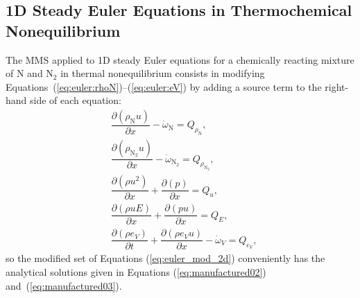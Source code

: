 \documentclass[10pt]{article}
\newcommand{\Diff}[2] {\dfrac{\partial( #1)}{\partial #2}}
\begin{document}

\subsection{1D Steady Euler Equations in Thermochemical Nonequilibrium}

The MMS applied to 1D steady Euler equations for a chemically reacting mixture of  N and N$_{2}$ in thermal nonequilibrium consists in modifying  Equations~(\ref{eq:euler:rhoN})--(\ref{eq:euler:eV}) by adding a source term to the right-hand side of each equation:
\begin{equation}
 \label{eq:euler_mod_2d}
\begin{split}
&\Diff{\rho_{\text{N}} u}{x} -\dot{\omega}_{\text{N}}= Q_{\rho_{\text{N}}},\\
&\Diff{\rho_{\text{N}_2} u}{x} -\dot{\omega}_{\text{N}_2}= Q_{\rho_{\text{N}_2}},\\
&\Diff{\rho u^2 }{x}+ \Diff{p}{x} = Q_u,\\
&\Diff{\rho uE}{x}+ \Diff{pu}{x} = Q_{E},\\
&\Diff{\rho e_V }{t} + \Diff{\rho e_V u }{x}-\dot{\omega}_V =Q_{e_V},
\end{split}
\end{equation}
%
so the modified set of Equations (\ref{eq:euler_mod_2d}) conveniently has the analytical solutions given in Equations (\ref{eq:manufactured02}) and~(\ref{eq:manufactured03}).
%
\end{document}
